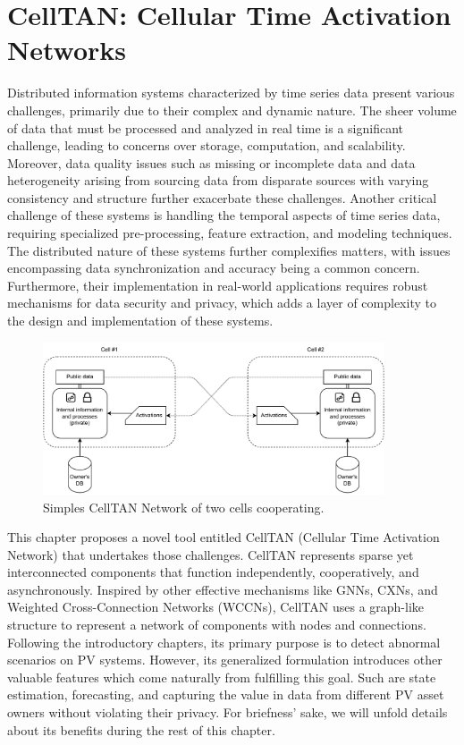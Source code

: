 \chapter{CellTAN: Cellular Time Activation Networks} \label{chap:chap4}

Distributed information systems characterized by time series data present various challenges, primarily due to their complex and dynamic nature. The sheer volume of data that must be processed and analyzed in real time is a significant challenge, leading to concerns over storage, computation, and scalability. Moreover, data quality issues such as missing or incomplete data and data heterogeneity arising from sourcing data from disparate sources with varying consistency and structure further exacerbate these challenges. Another critical challenge of these systems is handling the temporal aspects of time series data, requiring specialized pre-processing, feature extraction, and modeling techniques. The distributed nature of these systems further complexifies matters, with issues encompassing data synchronization and accuracy being a common concern. Furthermore, their implementation in real-world applications requires robust mechanisms for data security and privacy, which adds a layer of complexity to the design and implementation of these systems.

\begin{figure}[h!]
    \centering
    \includegraphics[width=0.9\textwidth]{figures/chapter4/cell/intro.pdf}
    \caption{Simples CellTAN Network of two cells cooperating.}
    \label{fig:celltanintro}
\end{figure}

This chapter proposes a novel tool entitled CellTAN (Cellular Time Activation Network) that undertakes those challenges. CellTAN represents sparse yet interconnected components that function independently, cooperatively, and asynchronously. Inspired by other effective mechanisms like GNNs, CXNs, and Weighted Cross-Connection Networks (WCCNs), CellTAN uses a graph-like structure to represent a network of components with nodes and connections. Following the introductory chapters, its primary purpose is to detect abnormal scenarios on PV systems. However, its generalized formulation introduces other valuable features which come naturally from fulfilling this goal. Such are state estimation, forecasting, and capturing the value in data from different PV asset owners without violating their privacy. For briefness' sake, we will unfold details about its benefits during the rest of this chapter.

